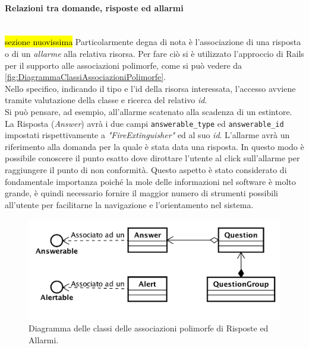 \paragraph*{Relazioni tra domande, risposte ed allarmi}\mbox{} \\
\hl{sezione nuovissima}
Particolarmente degna di nota è l'associazione di una risposta o di un \textit{allarme} alla relativa risorsa. Per fare ciò si è utilizzato l'approccio di Rails per il supporto alle associazioni polimorfe, come si può vedere da  \autoref{fig:DiagrammaClassiAssociazioniPolimorfe}.\\
Nello specifico, indicando il tipo e l'id della risorsa interessata, l'accesso avviene tramite valutazione della classe e ricerca del relativo \textit{id}. \\
Si può pensare, ad esempio, all'allarme scatenato alla scadenza di un estintore. \\
La Risposta (\textit{Answer}) avrà i due campi \texttt{answerable\_type} ed \texttt{answerable\_id} impostati rispettivamente a \textit{"FireExtinguisher"} ed al suo \textit{id}.  L'allarme avrà un riferimento alla domanda per la quale è stata data una risposta. In questo modo è possibile conoscere il punto esatto dove dirottare l'utente al click sull'allarme per raggiungere il punto di non conformità. Questo aspetto è stato considerato di fondamentale importanza poiché la mole delle informazioni nel software è molto grande, è quindi necessario fornire il maggior numero di strumenti possibili all'utente per facilitarne la navigazione e l'orientamento nel sistema.
\begin{figure}[H]
	\begin{center}
		\includegraphics[width=14cm]{Pics/diagramma_classi_associazioni_polimorfe.png}
		\caption{Diagramma delle classi delle associazioni polimorfe di Risposte ed Allarmi.}
		\label{fig:DiagrammaClassiAssociazioniPolimorfe}
	\end{center}
\end{figure}


